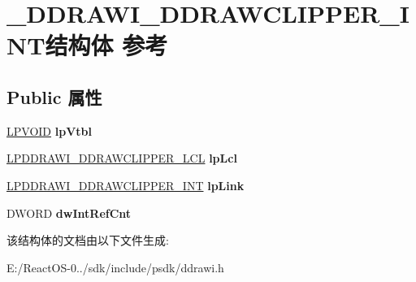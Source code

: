 \hypertarget{struct___d_d_r_a_w_i___d_d_r_a_w_c_l_i_p_p_e_r___i_n_t}{}\section{\+\_\+\+D\+D\+R\+A\+W\+I\+\_\+\+D\+D\+R\+A\+W\+C\+L\+I\+P\+P\+E\+R\+\_\+\+I\+N\+T结构体 参考}
\label{struct___d_d_r_a_w_i___d_d_r_a_w_c_l_i_p_p_e_r___i_n_t}
\subsection*{Public 属性}
\begin{DoxyCompactItemize}
\item 
\mbox{\label{struct___d_d_r_a_w_i___d_d_r_a_w_c_l_i_p_p_e_r___i_n_t_afa0af49f48b31b984aad84031208e994}} 
\hyperlink{interfacevoid}{L\+P\+V\+O\+ID} {\bfseries lp\+Vtbl}
\item 
\mbox{\label{struct___d_d_r_a_w_i___d_d_r_a_w_c_l_i_p_p_e_r___i_n_t_aee890ce815a8fbe2518920b40aa60462}} 
\hyperlink{struct___d_d_r_a_w_i___d_d_r_a_w_c_l_i_p_p_e_r___l_c_l}{L\+P\+D\+D\+R\+A\+W\+I\+\_\+\+D\+D\+R\+A\+W\+C\+L\+I\+P\+P\+E\+R\+\_\+\+L\+CL} {\bfseries lp\+Lcl}
\item 
\mbox{\label{struct___d_d_r_a_w_i___d_d_r_a_w_c_l_i_p_p_e_r___i_n_t_a52d78075f237bacd40ec9cf2d4df512e}} 
\hyperlink{struct___d_d_r_a_w_i___d_d_r_a_w_c_l_i_p_p_e_r___i_n_t}{L\+P\+D\+D\+R\+A\+W\+I\+\_\+\+D\+D\+R\+A\+W\+C\+L\+I\+P\+P\+E\+R\+\_\+\+I\+NT} {\bfseries lp\+Link}
\item 
\mbox{\label{struct___d_d_r_a_w_i___d_d_r_a_w_c_l_i_p_p_e_r___i_n_t_a6d668cf87afaf56a819b76d93a00714e}} 
D\+W\+O\+RD {\bfseries dw\+Int\+Ref\+Cnt}
\end{DoxyCompactItemize}


该结构体的文档由以下文件生成\+:\begin{DoxyCompactItemize}
\item 
E\+:/\+React\+O\+S-\/0../sdk/include/psdk/ddrawi.\+h\end{DoxyCompactItemize}

